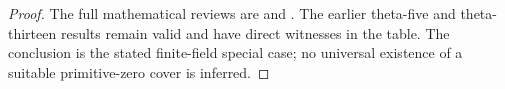 \begin{proof}
The full mathematical reviews are
and
.
The earlier theta-five and theta-thirteen
results remain valid and have direct
witnesses in the table. The conclusion
is the stated finite-field special case;
no universal existence of a suitable
primitive-zero cover is inferred.
\end{proof}
